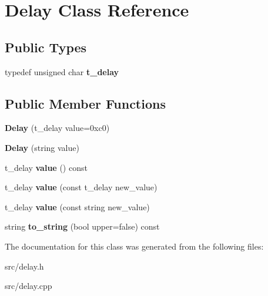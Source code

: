\hypertarget{class_delay}{}\section{Delay Class Reference}
\label{class_delay}
\subsection*{Public Types}
\begin{DoxyCompactItemize}
\item 
typedef unsigned char {\bfseries t\+\_\+delay}\hypertarget{class_delay_ab772b8936d1dd7deba9d113789576e00}{}\label{class_delay_ab772b8936d1dd7deba9d113789576e00}

\end{DoxyCompactItemize}
\subsection*{Public Member Functions}
\begin{DoxyCompactItemize}
\item 
{\bfseries Delay} (t\+\_\+delay value=0xc0)\hypertarget{class_delay_a2670af5b0479a5094c0b56658574a88b}{}\label{class_delay_a2670af5b0479a5094c0b56658574a88b}

\item 
{\bfseries Delay} (string value)\hypertarget{class_delay_a938c573c7446da67de348fdd50abb59d}{}\label{class_delay_a938c573c7446da67de348fdd50abb59d}

\item 
t\+\_\+delay {\bfseries value} () const \hypertarget{class_delay_a2315b17112d285d7bfbee6b8af19d691}{}\label{class_delay_a2315b17112d285d7bfbee6b8af19d691}

\item 
t\+\_\+delay {\bfseries value} (const t\+\_\+delay new\+\_\+value)\hypertarget{class_delay_aadc78a3c8baf305962575cdf992d2afb}{}\label{class_delay_aadc78a3c8baf305962575cdf992d2afb}

\item 
t\+\_\+delay {\bfseries value} (const string new\+\_\+value)\hypertarget{class_delay_a1a35dccd471fdce4d99929a35092d4ad}{}\label{class_delay_a1a35dccd471fdce4d99929a35092d4ad}

\item 
string {\bfseries to\+\_\+string} (bool upper=false) const \hypertarget{class_delay_a2e18e12cc6aade74d6ec2dc8206f8f10}{}\label{class_delay_a2e18e12cc6aade74d6ec2dc8206f8f10}

\end{DoxyCompactItemize}


The documentation for this class was generated from the following files\+:\begin{DoxyCompactItemize}
\item 
src/delay.\+h\item 
src/delay.\+cpp\end{DoxyCompactItemize}
